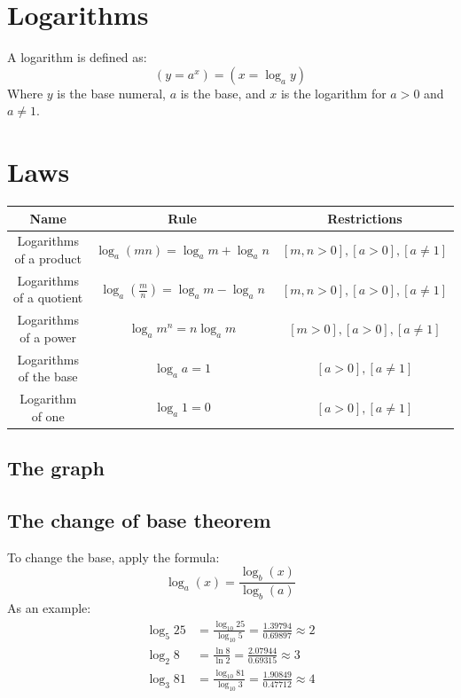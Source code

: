 \documentclass{book}
\begin{document}
\chapter{Logarithms}
A logarithm is defined as:
\[
	(y = a^x) = (x = \log_ay)
\]
Where $y$ is the base numeral, $a$ is the base, and $x$ is the logarithm for $a > 0$ and $a \not = 1$.

\chapter{Laws}
\begin{center}
	\begin{tabular}{c|c|c}
		Name                     & Rule                                      & Restrictions                        \\ \hline
		Logarithms of a product  & $\log_a(mn) = \log_am + \log_an$          & $[m, n > 0], [a > 0], [a \not = 1]$ \\
		Logarithms of a quotient & $\log_a(\frac{m}{n}) = \log_am - \log_an$ & $[m, n > 0], [a > 0], [a \not = 1]$ \\
		Logarithms of a power    & $\log_am^n = n\log_am$                    & $[m > 0], [a > 0], [a \not = 1]$    \\
		Logarithms of the base   & $\log_aa = 1$                             & $[a > 0], [a \not = 1]$             \\
		Logarithm of one         & $\log_a 1 = 0$                            & $[a > 0], [a \not = 1]$
	\end{tabular}
\end{center}

\section{The graph}
\begin{center}
\end{center}

\section{The change of base theorem}
To change the base, apply the formula:
\[
	\log_{a}{(x)} = \frac{\log_{b}{(x)}}{\log_{b}{(a)}}
\]
As an example:
\begin{align*}
	\log_{5}25 & = \frac{\log_{10}25}{\log_{10}5} = \frac{1.39794}{0.69897} \approx 2 \\
	\log_{2}8  & = \frac{\ln 8}{\ln 2} = \frac{2.07944}{0.69315} \approx 3            \\
	\log_{3}81 & = \frac{\log_{10}81}{\log_{10}3} = \frac{1.90849}{0.47712} \approx 4
\end{align*}
\end{document}
